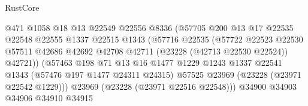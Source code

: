 \begin{lexlean}{RustCore}
\begin{coremodule}
                                        @471
                                        @1058
                                        @18
                                        @13
                                        @22549
                                        @22556
                                        @8336
                                        (@57705
                                          @200
                                          @13
                                          @17
                                          @22535
                                          @22548
                                          @22555
                                          @1337
                                          @22515
                                          @1343
                                          (@57716
                                            @22535
                                            (@57722
                                              @22523
                                              @22530
                                              @57511
                                              @42686
                                              @42692
                                              @42708
                                              @42711
                                              (@23228 (@42713 @22530 @22524))
                                              @42721))
                                          (@57463
                                            @198
                                            @71
                                            @13
                                            @16
                                            @1477
                                            @1229
                                            @1243
                                            @1337
                                            @22541
                                            @1343
                                            (@57476 @197 @1477 @24311 @24315)
                                            @57525
                                            @23969
                                            (@23228 (@23971 @22542 @1229)))
                                          @23969
                                          (@23228 (@23971 @22516 @22548)))
                                        @34900
                                        @34903
                                        @34906
                                        @34910
                                        @34915

\end{coremodule}
\end{lexlean}
